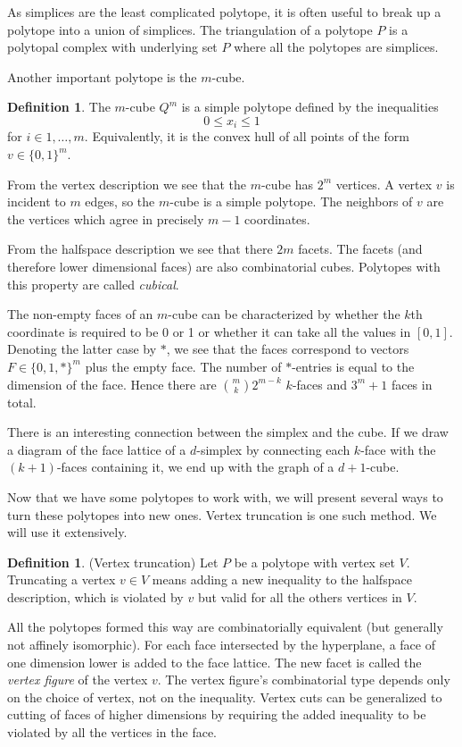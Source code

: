 \documentclass[a4paper,12pt]{book}
\theoremstyle{plain}
\theoremstyle{definition}
\newtheorem{definition}[theorem]{Definition}
\begin{document}
As simplices are the least complicated polytope, it is often useful to break up a polytope into
a union of simplices. The triangulation of a polytope $P$ is a polytopal complex with underlying set
$P$ where all the polytopes are simplices.


Another important polytope is the $m$-cube.

\begin{definition}
 The $m$-cube $Q^m$ is a simple polytope defined by the inequalities
\begin{equation}
 0 \leq x_i \leq 1 
\end{equation}
for $i \in 1,\dots, m$. Equivalently, it is the convex hull of all points of the form $v \in \{0,1\}^m$.
\end{definition}
From the vertex description we see that the $m$-cube has $2^m$ vertices. A vertex $v$
is incident to $m$ edges, so the $m$-cube is a simple polytope. The neighbors of $v$ are
the vertices which agree in precisely $m-1$ coordinates.

From the halfspace description we see that there $2m$ facets. The facets (and therefore lower dimensional faces)
are also combinatorial cubes. Polytopes with this property are called \textit{cubical}. 

The non-empty faces of an $m$-cube can be characterized by whether the $k$th coordinate 
is required to be 0 or 1 or whether it can take all the values in $[0,1]$. Denoting the latter case by $*$, we see
that the faces correspond to vectors $F \in \{0,1,*\}^m$ plus the empty face. The number of $*$-entries 
is equal to the dimension of the face. Hence there are $\binom{m}{k} 2^{m-k}$ $k$-faces and $3^m +1$ faces in total.

There is an interesting connection between the simplex and the cube. If we draw a diagram
of the face lattice of a $d$-simplex by connecting each $k$-face with the $(k+1)$-faces containing it,
we end up with the graph of a $d+1$-cube.

Now that we have some polytopes to work with, we will present several ways to turn these polytopes into new ones.
Vertex truncation is one such method.
We will use it extensively.
\begin{definition}
(Vertex truncation) Let $P$ be a polytope with vertex set $V$. Truncating a vertex $v \in V$ means adding
a new inequality to the halfspace description, which is violated by $v$ but valid for all the others vertices in $V$.
\end{definition}
All the polytopes formed this way are combinatorially equivalent (but generally not affinely isomorphic). 
For each face intersected by the hyperplane, 
a face of one dimension lower is added to the face lattice. The new facet is 
called the \textit{vertex figure} of the vertex $v$. The vertex figure's combinatorial type 
depends only on the choice of vertex, not on the inequality. Vertex cuts can be generalized to cutting of 
faces of higher dimensions by requiring the added inequality to be violated by 
all the vertices in the face. 
\end{document}
